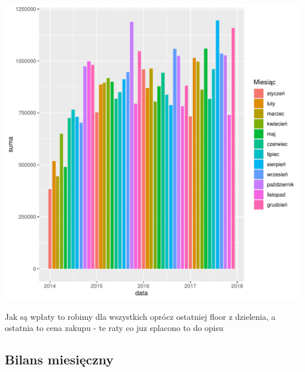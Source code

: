 \documentclass{article}\usepackage[]{graphicx}\usepackage[]{xcolor}
\makeatletter
\def\maxwidth{ %
  \ifdim\Gin@nat@width>\linewidth
    \linewidth
  \else
    \Gin@nat@width
  \fi
}
\newenvironment{knitrout}{}{} %
\makeatother
\begin{document}
\begin{knitrout}
\color{fgcolor}

{\centering \includegraphics[width=\maxwidth]{figure/unnamed-chunk-6-1} 

}


\end{knitrout}


Jak są wpłaty to robimy dla wszystkich oprócz ostatniej floor z dzielenia, a ostatnia to cena zakupu - te raty co juz splacono
{\color{red} to do opisu}

\subsection{Bilans miesięczny}
\end{document}
